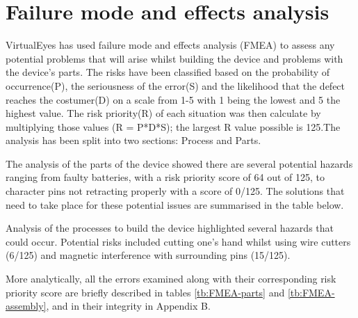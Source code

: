 \section{Failure mode and effects analysis}
VirtualEyes has used failure mode and effects analysis (FMEA) to assess any potential problems that will arise whilst building the device and problems with the device's parts. The risks have been classified based on the probability of occurrence(P), the seriousness of the error(S) and the likelihood that the defect reaches the costumer(D) on a scale from 1-5 with 1 being the lowest and 5 the highest value. The risk priority(R) of each situation was then calculate by multiplying those values (R = P*D*S); the largest R value possible is 125.The analysis has been split into two sections: Process and Parts. 

The analysis of the parts of the device showed there are several potential hazards ranging from faulty batteries, with a risk priority score of 64 out of 125, to character pins not retracting properly with a score of 0/125. The solutions that need to take place for these potential issues are summarised in the table below. 

Analysis of the processes to build the device highlighted several hazards that could occur. Potential risks included cutting one's hand whilst using wire cutters (6/125) and magnetic interference with surrounding pins (15/125).

More analytically, all the errors examined along with their corresponding risk priority score are briefly described in tables \ref{tb:FMEA-parts} and \ref{tb:FMEA-assembly}, and in their integrity in Appendix B.

